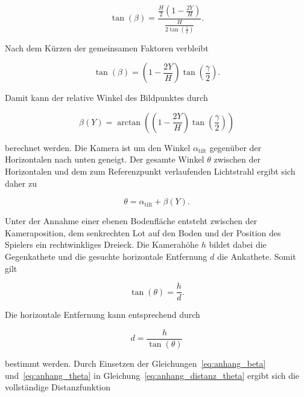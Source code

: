 \begin{equation} 
    \tan(\beta) = \frac{ \frac{H}{2} \left(1-\frac{2Y}{H}\right) }{ \frac{H}{ 2\tan\left(\frac{\gamma}{2}\right) } }. 
    \label{eq:anhang_beta_eingesetzt} 
\end{equation} 

Nach dem Kürzen der gemeinsamen Faktoren verbleibt 

\begin{equation} 
    \tan(\beta) = \left( 1-\frac{2Y}{H} \right) \tan\left(\frac{\gamma}{2}\right). 
    \label{eq:anhang_beta_tangens} 
\end{equation} 

Damit kann der relative Winkel des Bildpunktes durch 

\begin{equation} 
    \beta(Y) = \arctan\left( \left(1-\frac{2Y}{H}\right) \tan\left(\frac{\gamma}{2}\right) \right) 
    \label{eq:anhang_beta} 
\end{equation} 

berechnet werden. Die Kamera ist um den Winkel \(\alpha_{\mathrm{tilt}}\) gegenüber der Horizontalen nach unten geneigt. Der gesamte Winkel \(\theta\) zwischen der Horizontalen und dem zum Referenzpunkt verlaufenden Lichtstrahl ergibt sich daher zu 

\begin{equation} 
    \theta = \alpha_{\mathrm{tilt}}+\beta(Y). 
    \label{eq:anhang_theta} 
\end{equation} 

Unter der Annahme einer ebenen Bodenfläche entsteht zwischen der Kameraposition, dem senkrechten Lot auf den Boden und der Position des Spielers ein rechtwinkliges Dreieck. Die Kamerahöhe \(h\) bildet dabei die Gegenkathete und die gesuchte horizontale Entfernung \(d\) die Ankathete. Somit gilt 

\begin{equation} 
    \tan(\theta) = \frac{h}{d}. 
    \label{eq:anhang_distanz_dreieck} 
\end{equation} 

Die horizontale Entfernung kann entsprechend durch 

\begin{equation} 
    d = \frac{h}{\tan(\theta)} 
    \label{eq:anhang_distanz_theta} 
\end{equation} 

bestimmt werden. Durch Einsetzen der Gleichungen~\ref{eq:anhang_beta} und~\ref{eq:anhang_theta} in Gleichung~\ref{eq:anhang_distanz_theta} ergibt sich die vollständige Distanzfunktion 

